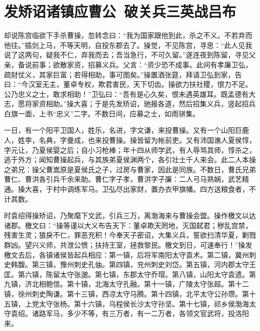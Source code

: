 \chapter{发矫诏诸镇应曹公~破关兵三英战吕布}

却说陈宫临欲下手杀曹操，忽转念曰：“我为国家跟他到此，杀之不义。不若弃而他往。”插剑上马，不等天明，自投东郡去了。操觉，不见陈宫，寻思：“此人见我说了这两句，疑我不仁，弃我而去；吾当急行，不可久留。”遂连夜到陈留，寻见父亲，备说前事；欲散家资，招募义兵。父言：“资少恐不成事。此间有孝廉卫弘，疏财仗义，其家巨富；若得相助，事可图矣。”操置酒张筵，拜请卫弘到家，告曰：“今汉室无主，董卓专权，欺君害民，天下切齿。操欲力扶社稷，恨力不足。公乃忠义之士，敢求相助！”卫弘曰：“吾有是心久矣，恨未遇英雄耳。既孟德有大志，愿将家资相助。”操大喜；于是先发矫诏，驰报各道，然后招集义兵，竖起招兵白旗一面，上书“忠义”二字。不数日间，应募之士，如雨骈集。

一日，有一个阳平卫国人，姓乐，名进，字文谦，来投曹操。又有一个山阳巨鹿人，姓李，名典，字曼成，也来投曹操。操皆留为帐前吏。又有沛国谯人夏侯惇，字元让，乃夏侯婴之后；自小习枪棒；年十四从师学武，有人辱骂其师，惇杀之，逃于外方；闻知曹操起兵，与其族弟夏侯渊两个，各引壮士千人来会。此二人本操之弟兄：操父曹嵩原是夏侯氏之子，过房与曹家，因此是同族。不数日，曹氏兄弟曹仁、曹洪各引兵千余来助。曹仁字子孝，曹洪字子廉：二人弓马熟娴，武艺精通。操大喜，于村中调练军马。卫弘尽出家财，置办衣甲旗幡。四方送粮食者，不计其数。

时袁绍得操矫诏，乃聚麾下文武，引兵三万，离渤海来与曹操会盟。操作檄文以达诸郡。檄文曰：“操等谨以大义布告天下：董卓欺天罔地，灭国弑君；秽乱宫禁，残害生灵；狼戾不仁，罪恶充积！今奉天子密诏，大集义兵，誓欲扫清华夏，剿戮群凶。望兴义师，共泄公愤；扶持王室，拯救黎民。檄文到日，可速奉行！”操发檄文去后，各镇诸侯皆起兵相应：第一镇，后将军南阳太守袁术。第二镇，冀州刺史韩馥。第三镇，豫州刺史孔伷。第四镇，兖州刺史刘岱。第五镇，河内郡太守王匡。第六镇，陈留太守张邈。第七镇，东郡太守乔瑁。第八镇，山阳太守袁遗。第九镇，济北相鲍信。第十镇，北海太守孔融。第十一镇，广陵太守张超。第十二镇，徐州刺史陶谦。第十三镇，西凉太守马腾。第十四镇，北平太守公孙瓒。第十五镇，上党太守张杨。第十六镇，乌程侯长沙太守孙坚。第十七镇，祁乡侯渤海太守袁绍。诸路军马，多少不等，有三万者，有一二万者，各领文官武将，投洛阳来。

